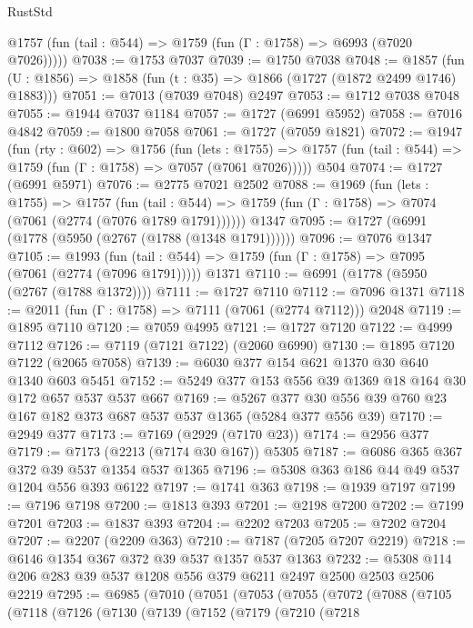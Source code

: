 \begin{lexlean}{RustStd}
\begin{coremodule}
      @1757 (fun (tail : @544) => @1759 (fun (Γ : @1758) => @6993 (@7020 @7026)))))
@7038 := @1753 @7037
@7039 := @1750 @7038
@7048 := @1857 (fun (U : @1856) => @1858 (fun (t : @35) => @1866 (@1727 (@1872 @2499 @1746) @1883)))
@7051 := @7013 (@7039 @7048) @2497
@7053 := @1712 @7038 @7048
@7055 := @1944 @7037 @1184
@7057 := @1727 (@6991 @5952)
@7058 := @7016 @4842
@7059 := @1800 @7058
@7061 := @1727 (@7059 @1821)
@7072 := @1947
    (fun (rty : @602) =>
    @1756
      (fun (lets : @1755) =>
      @1757 (fun (tail : @544) => @1759 (fun (Γ : @1758) => @7057 (@7061 @7026)))))
    @504
@7074 := @1727 (@6991 @5971)
@7076 := @2775 @7021 @2502
@7088 := @1969
    (fun (lets : @1755) =>
    @1757
      (fun (tail : @544) => @1759 (fun (Γ : @1758) => @7074 (@7061 (@2774 (@7076 @1789 @1791))))))
    @1347
@7095 := @1727 (@6991 (@1778 (@5950 (@2767 (@1788 (@1348 @1791))))))
@7096 := @7076 @1347
@7105 := @1993
    (fun (tail : @544) => @1759 (fun (Γ : @1758) => @7095 (@7061 (@2774 (@7096 @1791)))))
    @1371
@7110 := @6991 (@1778 (@5950 (@2767 (@1788 @1372))))
@7111 := @1727 @7110
@7112 := @7096 @1371
@7118 := @2011 (fun (Γ : @1758) => @7111 (@7061 (@2774 @7112))) @2048
@7119 := @1895 @7110
@7120 := @7059 @4995
@7121 := @1727 @7120
@7122 := @4999 @7112
@7126 := @7119 (@7121 @7122) (@2060 @6990)
@7130 := @1895 @7120 @7122 (@2065 @7058)
@7139 := @6030 @377 @154 @621 @1370 @30 @640 @1340 @603 @5451
@7152 := @5249 @377 @153 @556 @39 @1369 @18 @164 @30 @172 @657 @537 @537 @667
@7169 := @5267 @377 @30 @556 @39 @760 @23 @167 @182 @373 @687 @537 @537 @1365 (@5284 @377 @556 @39)
@7170 := @2949 @377
@7173 := @7169 (@2929 (@7170 @23))
@7174 := @2956 @377
@7179 := @7173 (@2213 (@7174 @30 @167)) @5305
@7187 := @6086 @365 @367 @372 @39 @537 @1354 @537 @1365
@7196 := @5308 @363 @186 @44 @49 @537 @1204 @556 @393 @6122
@7197 := @1741 @363
@7198 := @1939 @7197
@7199 := @7196 @7198
@7200 := @1813 @393
@7201 := @2198 @7200
@7202 := @7199 @7201
@7203 := @1837 @393
@7204 := @2202 @7203
@7205 := @7202 @7204
@7207 := @2207 (@2209 @363)
@7210 := @7187 (@7205 @7207 @2219)
@7218 := @6146 @1354 @367 @372 @39 @537 @1357 @537 @1363
@7232 := @5308 @114 @206 @283 @39 @537 @1208 @556 @379 @6211 @2497 @2500 @2503 @2506 @2219
@7295 := @6985
    (@7010
      (@7051
        (@7053
          (@7055
            (@7072
              (@7088
                (@7105
                  (@7118
                    (@7126
                      (@7130
                        (@7139
                          (@7152
                            (@7179
                              (@7210
                                (@7218

\end{coremodule}
\end{lexlean}
